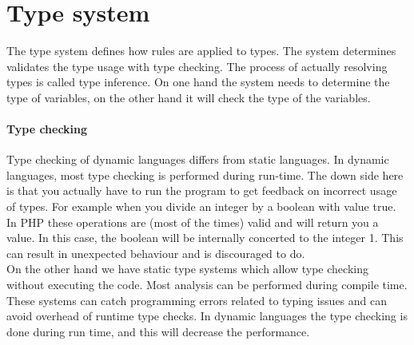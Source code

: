 \documentclass[../main.tex]{subfiles}
\begin{document}
    \section{Type system}\label{sec:background_type-system}
    The type system defines how rules are applied to types.
    The system determines validates the type usage with type checking.
    The process of actually resolving types is called type inference.
    On one hand the system needs to determine the type of variables, on the other hand it will check the type of the variables.
    \paragraph{Type checking}
    Type checking of dynamic languages differs from static languages.
    In dynamic languages, most type checking is performed during run-time.
    The down side here is that you actually have to run the program to get feedback on incorrect usage of types. 
    For example when you divide an integer by a boolean with value true.
    In PHP these operations are (most of the times) valid and will return you a value.
    In this case, the boolean will be internally concerted to the integer 1.
    This can result in unexpected behaviour and is discouraged to do.
    \\
    On the other hand we have static type systems which allow type checking without executing the code.
    Most analysis can be performed during compile time.
    These systems can catch programming errors related to typing issues and can avoid overhead of runtime type checks.
    In dynamic languages the type checking is done during run time, and this will decrease the performance.
    
\end{document}
